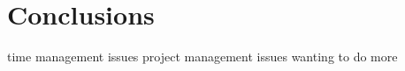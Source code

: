 \newpage
\chapter*{Conclusions}

time management issues
project management issues
wanting to do more 




%
%
 

